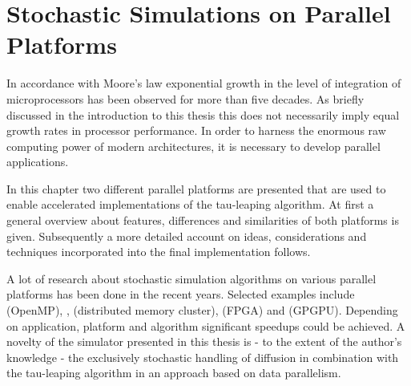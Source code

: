 \chapter{Stochastic Simulations on Parallel Platforms}

In accordance with Moore's law exponential growth in the level of integration of microprocessors has been observed for more than five decades. As briefly discussed in the introduction to this thesis this does not necessarily imply equal growth rates in processor performance. In order to harness the enormous raw computing power of modern architectures, it is necessary to develop parallel applications. 

In this chapter two different parallel platforms are presented that are used to enable accelerated implementations of the tau-leaping algorithm. At first a general overview about features, differences and similarities of both platforms is given. Subsequently a more detailed account on ideas, considerations and techniques incorporated into the final implementation follows. 

A lot of research about stochastic simulation algorithms on various parallel platforms has been done in the recent years. Selected examples include \cite{tian_parallel_2005} (OpenMP), \cite{kent_condor-copasi:_2012}, \cite{burrage_compute-intensive_2005} (distributed memory cluster), \cite{macchiarulo_massively_2008} (FPGA) and \cite{nobile_cutauleaping:_2014, li_efficient_2010, klingbeil_stochsimgpu:_2011, vigelius_accelerating_2011} (GPGPU). Depending on application, platform and algorithm significant speedups could be achieved. A novelty of the simulator presented in this thesis is - to the extent of the author's knowledge - the exclusively stochastic handling of diffusion in combination with the tau-leaping algorithm in an approach based on  data parallelism. 



